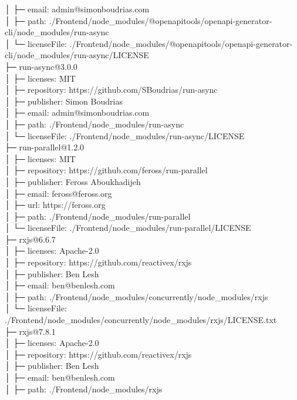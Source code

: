 │  ├─ email: admin@simonboudrias.com\\
│  ├─ path: ./Frontend/node\_modules/@openapitools/openapi-generator-cli/node\_modules/run-async\\
│  └─ licenseFile: ./Frontend/node\_modules/@openapitools/openapi-generator-cli/node\_modules/run-async/LICENSE\\
├─ run-async@3.0.0\\
│  ├─ licenses: MIT\\
│  ├─ repository: https://github.com/SBoudrias/run-async\\
│  ├─ publisher: Simon Boudrias\\
│  ├─ email: admin@simonboudrias.com\\
│  ├─ path: ./Frontend/node\_modules/run-async\\
│  └─ licenseFile: ./Frontend/node\_modules/run-async/LICENSE\\
├─ run-parallel@1.2.0\\
│  ├─ licenses: MIT\\
│  ├─ repository: https://github.com/feross/run-parallel\\
│  ├─ publisher: Feross Aboukhadijeh\\
│  ├─ email: feross@feross.org\\
│  ├─ url: https://feross.org\\
│  ├─ path: ./Frontend/node\_modules/run-parallel\\
│  └─ licenseFile: ./Frontend/node\_modules/run-parallel/LICENSE\\
├─ rxjs@6.6.7\\
│  ├─ licenses: Apache-2.0\\
│  ├─ repository: https://github.com/reactivex/rxjs\\
│  ├─ publisher: Ben Lesh\\
│  ├─ email: ben@benlesh.com\\
│  ├─ path: ./Frontend/node\_modules/concurrently/node\_modules/rxjs\\
│  └─ licenseFile: ./Frontend/node\_modules/concurrently/node\_modules/rxjs/LICENSE.txt\\
├─ rxjs@7.8.1\\
│  ├─ licenses: Apache-2.0\\
│  ├─ repository: https://github.com/reactivex/rxjs\\
│  ├─ publisher: Ben Lesh\\
│  ├─ email: ben@benlesh.com\\
│  ├─ path: ./Frontend/node\_modules/rxjs\\
